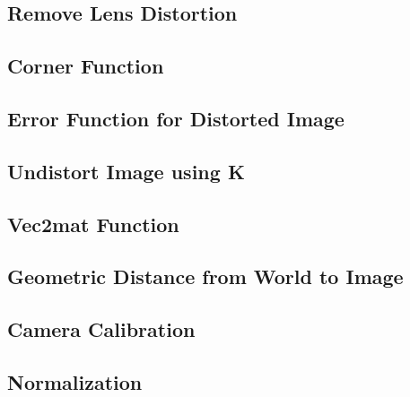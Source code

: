 \documentclass[conference]{IEEEtran}
\begin{document}
\newpage

\newpage
\appendix
\subsection{Remove Lens Distortion}

\subsection{Corner Function}

\subsection{Error Function for Distorted Image}

\subsection{Undistort Image using K}

\subsection{Vec2mat Function}

\subsection{Geometric Distance from World to Image}

\subsection{Camera Calibration}

\subsection{Normalization}










\end{document}
